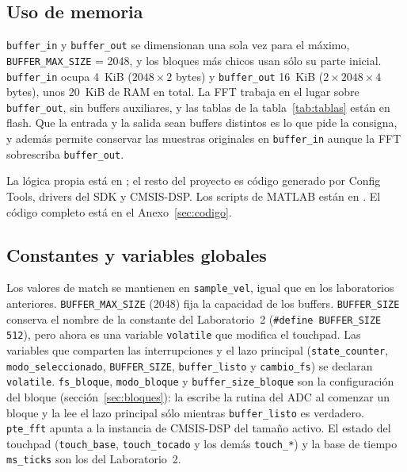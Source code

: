 \documentclass[11pt,a4paper]{article}
\begin{document}
\subsection{Uso de memoria}

\texttt{buffer\_in} y \texttt{buffer\_out} se dimensionan una sola vez para
el máximo, \texttt{BUFFER\_MAX\_SIZE} = \num{2048}, y los bloques
más chicos usan sólo su parte inicial. \texttt{buffer\_in} ocupa
4~KiB ($2048 \times 2$ bytes) y \texttt{buffer\_out}
16~KiB ($2 \times 2048 \times 4$ bytes), unos
20~KiB de RAM en total. La FFT trabaja en el lugar sobre
\texttt{buffer\_out}, sin buffers auxiliares, y las tablas de la
tabla~\ref{tab:tablas} están en flash. Que la entrada y la salida sean
buffers distintos es lo que pide la consigna, y además permite conservar
las muestras originales en \texttt{buffer\_in} aunque la FFT sobrescriba
\texttt{buffer\_out}.

\label{sec:implementacion}

La lógica propia está en ; el resto del proyecto es
código generado por Config Tools, drivers del SDK y CMSIS-DSP. Los scripts
de MATLAB están en . El código completo está en el
Anexo~\ref{sec:codigo}.

\subsection{Constantes y variables globales}

Los valores de match se mantienen en \texttt{sample\_vel}, igual que en los
laboratorios anteriores. \texttt{BUFFER\_MAX\_SIZE} (\num{2048}) fija la
capacidad de los buffers. \texttt{BUFFER\_SIZE} conserva el nombre de la
constante del Laboratorio~2 (\texttt{\#define BUFFER\_SIZE 512}), pero ahora es una variable \texttt{volatile}
que modifica el touchpad. Las variables que comparten las interrupciones y
el lazo principal (\texttt{state\_counter}, \texttt{modo\_seleccionado},
\texttt{BUFFER\_SIZE}, \texttt{buffer\_listo} y \texttt{cambio\_fs}) se
declaran \texttt{volatile}. \texttt{fs\_bloque}, \texttt{modo\_bloque} y
\texttt{buffer\_size\_bloque} son la configuración del bloque
(sección~\ref{sec:bloques}): la escribe la rutina del ADC al comenzar un
bloque y la lee el lazo principal sólo mientras \texttt{buffer\_listo} es
verdadero. \texttt{pte\_fft} apunta a la instancia de CMSIS-DSP del tamaño
activo. El estado del touchpad (\texttt{touch\_base},
\texttt{touch\_tocado} y los demás \texttt{touch\_*}) y la base de tiempo
\texttt{ms\_ticks} son los del Laboratorio~2.
\end{document}
